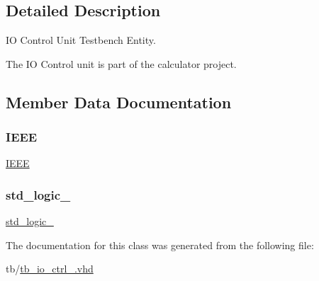 \subsection{Detailed Description}
IO Control Unit Testbench Entity. 

The IO Control unit is part of the calculator project. 

\subsection{Member Data Documentation}
\mbox{\label{classtb__io__ctrl_ae4f03c286607f3181e16b9aa12d0c6d4}} 
\subsubsection{\texorpdfstring{I\+E\+EE}{IEEE}}
{\footnotesize\ttfamily \hyperlink{classtb__io__ctrl_ae4f03c286607f3181e16b9aa12d0c6d4}{I\+E\+EE}\hspace{0.3cm}{\ttfamily [Library]}}

\mbox{\label{classtb__io__ctrl_acd03516902501cd1c7296a98e22c6fcb}} 
\subsubsection{\texorpdfstring{std\+\_\+logic\+\_}{std\_logic\_1164}}
{\footnotesize\ttfamily \hyperlink{classtb__io__ctrl_acd03516902501cd1c7296a98e22c6fcb}{std\+\_\+logic\+\_}\hspace{0.3cm}{\ttfamily [Package]}}



The documentation for this class was generated from the following file\+:\begin{DoxyCompactItemize}
\item 
tb/\hyperlink{tb__io__ctrl___8vhd}{tb\+\_\+io\+\_\+ctrl\+\_\+.\+vhd}\end{DoxyCompactItemize}
